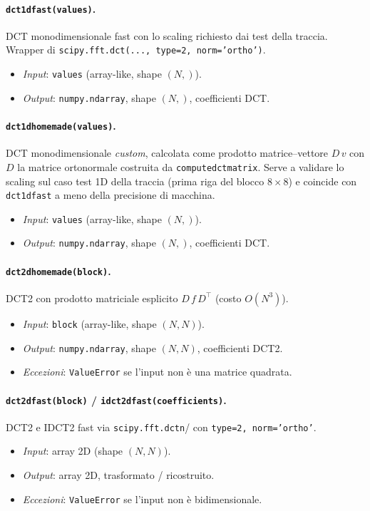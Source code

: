\documentclass[11pt,a4paper]{article}
\makeatletter
\let\@origtexttt\texttt
\renewcommand{\texttt}[1]{{\def\_{\textunderscore\discretionary{}{}{}}\@origtexttt{#1}}}
\makeatother
\begin{document}
\paragraph{\texttt{dct\_1d\_fast(values)}.}
DCT monodimensionale fast con lo scaling richiesto dai test della traccia.
Wrapper di \texttt{scipy.fft.dct(..., type=2, norm='ortho')}.
\begin{itemize}
  \item \emph{Input}: \texttt{values} (array-like, shape $(N,)$).
  \item \emph{Output}: \texttt{numpy.ndarray}, shape $(N,)$, coefficienti DCT.
\end{itemize}

\paragraph{\texttt{dct\_1d\_homemade(values)}.}
DCT monodimensionale \emph{custom}, calcolata come prodotto matrice--vettore
$D\,v$ con $D$ la matrice ortonormale costruita da \texttt{compute\_dct\_matrix}.
Serve a validare lo scaling sul caso test 1D della traccia (prima riga del
blocco $8\times8$) e coincide con \texttt{dct\_1d\_fast} a meno della precisione
di macchina.
\begin{itemize}
  \item \emph{Input}: \texttt{values} (array-like, shape $(N,)$).
  \item \emph{Output}: \texttt{numpy.ndarray}, shape $(N,)$, coefficienti DCT.
\end{itemize}

\paragraph{\texttt{dct\_2d\_homemade(block)}.}
DCT2 con prodotto matriciale esplicito $D\,f\,D^\top$ (costo $O(N^3)$).
\begin{itemize}
  \item \emph{Input}: \texttt{block} (array-like, shape $(N,N)$).
  \item \emph{Output}: \texttt{numpy.ndarray}, shape $(N,N)$, coefficienti DCT2.
  \item \emph{Eccezioni}: \texttt{ValueError} se l'input non è una matrice
        quadrata.
\end{itemize}

\paragraph{\texttt{dct\_2d\_fast(block)} / \texttt{idct\_2d\_fast(coefficients)}.}
DCT2 e IDCT2 fast via \texttt{scipy.\allowbreak fft.\allowbreak dctn}/\allowbreak\texttt{idctn} con
\texttt{type=2, norm='ortho'}.
\begin{itemize}
  \item \emph{Input}: array 2D (shape $(N,N)$).
  \item \emph{Output}: array 2D, trasformato / ricostruito.
  \item \emph{Eccezioni}: \texttt{ValueError} se l'input non è bidimensionale.
\end{itemize}
\end{document}

